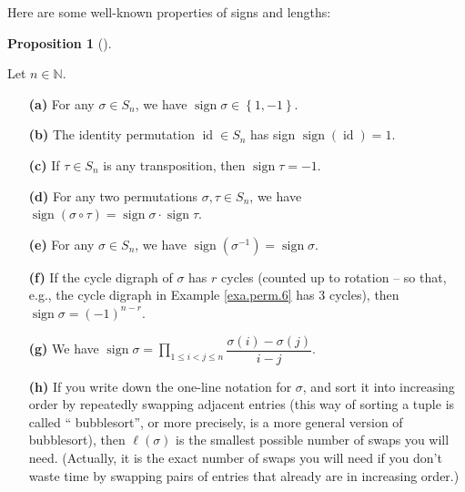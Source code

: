 \documentclass[numbers=enddot,12pt,final,onecolumn,notitlepage]{scrartcl}%
\numberwithin{exer}{subsection}
\theoremstyle{definition}
\newtheorem{prop}[theo]{Proposition}
\newenvironment{proposition}[1][]
{\begin{prop}[#1]\begin{leftbar}}
{\end{leftbar}\end{prop}}
\let\prodnonlimits\prod
\renewcommand{\prod}{\prodnonlimits\limits}
\begin{document}
Here are some well-known properties of signs and lengths:

\begin{proposition}
\label{prop.perms.sign.var}Let $n\in\mathbb{N}$.

\begin{enumerate}
\item[\textbf{(a)}] For any $\sigma\in S_{n}$, we have $\operatorname*{sign}%
\sigma\in\left\{  1,-1\right\}  $.

\item[\textbf{(b)}] The identity permutation $\operatorname*{id}\in S_{n}$ has
sign $\operatorname*{sign}\left(  \operatorname*{id}\right)  =1$.

\item[\textbf{(c)}] If $\tau\in S_{n}$ is any transposition, then
$\operatorname*{sign}\tau=-1$.

\item[\textbf{(d)}] For any two permutations $\sigma,\tau\in S_{n}$, we have
$\operatorname*{sign}\left(  \sigma\circ\tau\right)  =\operatorname*{sign}%
\sigma\cdot\operatorname*{sign}\tau$.

\item[\textbf{(e)}] For any $\sigma\in S_{n}$, we have $\operatorname*{sign}%
\left(  \sigma^{-1}\right)  =\operatorname*{sign}\sigma$.

\item[\textbf{(f)}] If the cycle digraph of $\sigma$ has $r$ cycles (counted
up to rotation -- so that, e.g., the cycle digraph in Example \ref{exa.perm.6}
has $3$ cycles), then $\operatorname*{sign}\sigma=\left(  -1\right)  ^{n-r}$.

\item[\textbf{(g)}] We have $\operatorname*{sign}\sigma=\prod_{1\leq i<j\leq
n}\dfrac{\sigma\left(  i\right)  -\sigma\left(  j\right)  }{i-j}$.

\item[\textbf{(h)}] If you write down the one-line notation for $\sigma$, and
sort it into increasing order by repeatedly swapping adjacent entries (this
way of sorting a tuple is called \textquotedblleft
bubblesort\textquotedblright, or more precisely, is a more general version of
bubblesort), then $\ell\left(  \sigma\right)  $ is the smallest possible
number of swaps you will need. (Actually, it is the exact number of swaps you
will need if you don't waste time by swapping pairs of entries that already
are in increasing order.)
\end{enumerate}
\end{proposition}
\end{document}
